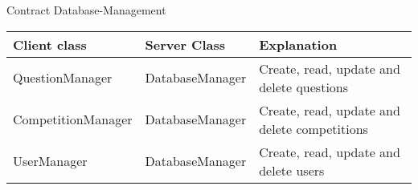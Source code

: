 \begin{subsubsection}{Contract Database-Management}
	\begin{tabular}{l l l }
	Client class & Server Class & Explanation \\ \hline
	QuestionManager & DatabaseManager & Create, read, update and delete questions \\
	CompetitionManager & DatabaseManager & Create, read, update and delete competitions \\
	UserManager & DatabaseManager & Create, read, update and delete users 
	\end{tabular}
\end{subsubsection}